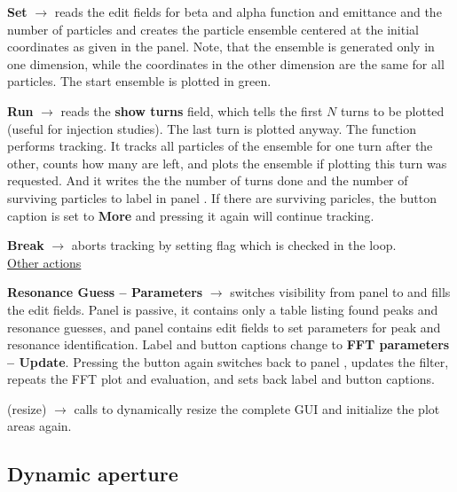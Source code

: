 \documentclass[12pt]{article}
\newcommand\code[1]{{\tt #1}}
\newcommand{\ofld}[1]{\colorbox{black!15}{{{\color{black}\bf #1}}}}
\newcommand{\ofldx}[1]{\colorbox{black!15}{{\color{black}(#1)}}}
\newcommand\guico[1]{{\color{blue}\code{#1}}}
\newcommand{\evcod}[2]{\ofld{#1} $\rightarrow$ \guico{#2}}
\newcommand{\evcodx}[2]{\ofldx{#1} $\rightarrow$ \guico{#2}}
\newcommand{\opagui}[1]{\colorbox{blue!20}{{\color{black}\code{#1}}}}
\newcommand{\oguih}[2]{\subsection{\label{#2}#1}{\Huge\opagui{#2}}\\}
\begin{document}
\evcod{Set}{ButBeamShowClick} reads the edit fields for beta and alpha function and emittance and the number of particles and creates the particle ensemble centered at the initial coordinates as given in the \guico{PanCtrl} panel. Note, that the ensemble is generated only in one dimension, while the coordinates in the other dimension are the same for all particles. The start ensemble is plotted in green.

\evcod{Run}{ButBeamRunClick} reads the \ofld{show turns} field, which tells the first $N$ turns to be plotted (useful for injection studies). The last turn is plotted anyway. The function \guico{TrackBeam} performs tracking. It tracks all particles of the ensemble for one turn after the other, counts how many are left, and plots the ensemble if plotting this turn was requested. And it writes the the number of turns done and the number of surviving particles to label \guico{LabT} in panel \guico{PanParam}. If there are surviving paricles, the button caption is set to \ofld{More} and pressing it again will continue tracking.

\evcod{Break}{ButBeamBreak} aborts tracking by setting flag \guico{BeamBreak} which is checked in the \guico{TrackBeam} loop.\\[1ex]

\underline{Other actions}

\evcod{Resonance Guess -- Parameters}{butParamClick} switches visibility from panel \guico{PanRes} to \guico{PanFFT} and fills the edit fields. Panel \guico{PanRes} is passive, it contains only a table listing found peaks and resonance guesses, and panel \guico{PanFFT} contains edit fields to set parameters for peak and resonance identification. Label and button captions change to \ofld{FFT parameters -- Update}. Pressing the button again switches back to panel \guico{PanRes}, updates the filter, repeats the FFT plot and evaluation, and sets back label and button captions.

\evcodx{resize}{FormResize} calls \guico{ResizeAll} to dynamically resize the complete GUI and initialize the plot areas again.





\oguih{Dynamic aperture}{opatrackda} 
\end{document}
